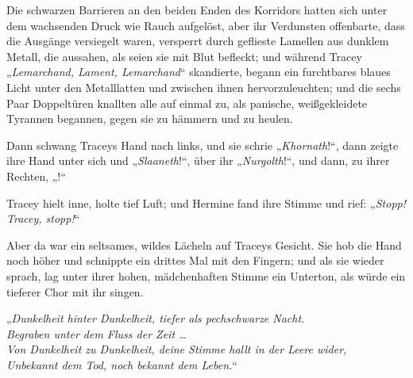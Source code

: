 Die schwarzen Barrieren an den beiden Enden des Korridors hatten sich unter dem wachsenden Druck wie Rauch aufgelöst, aber ihr Verdunsten offenbarte, dass die Ausgänge versiegelt waren, versperrt durch geflieste Lamellen aus dunklem Metall, die aussahen, als seien sie mit Blut befleckt; und während Tracey
„\emph{Lemarchand, Lament, Lemarchand}“ skandierte, begann ein furchtbares blaues Licht unter den Metalllatten und zwischen ihnen hervorzuleuchten; und die sechs Paar Doppeltüren knallten alle auf einmal zu, als panische, weißgekleidete Tyrannen begannen, gegen sie zu hämmern und zu heulen.

Dann schwang Traceys Hand nach links, und sie schrie
„\emph{Khornath}!“, dann zeigte ihre Hand unter sich und
„\emph{Slaaneth}!“, über ihr
„\emph{Nurgolth}!“, und dann, zu ihrer Rechten,
„!“

Tracey hielt inne, holte tief Luft; und Hermine fand ihre Stimme und rief:
„\emph{Stopp! Tracey, stopp!}“

Aber da war ein seltsames, wildes Lächeln auf Traceys Gesicht. Sie hob die Hand noch höher und schnippte ein drittes Mal mit den Fingern; und als sie wieder sprach, lag unter ihrer hohen, mädchenhaften Stimme ein Unterton, als würde ein tieferer Chor mit ihr singen.

„\emph{Dunkelheit hinter Dunkelheit, tiefer als pechschwarze Nacht.\\
Begraben unter dem Fluss der Zeit … \\
Von Dunkelheit zu Dunkelheit, deine Stimme hallt in der Leere wider,\\
Unbekannt dem Tod, noch bekannt dem Leben.}“

